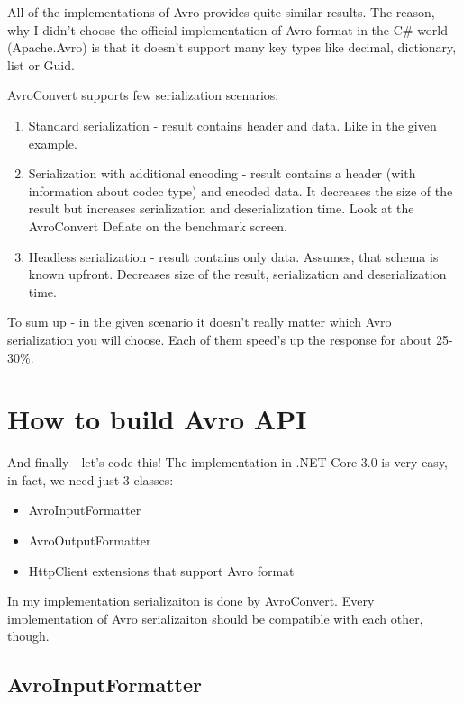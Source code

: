 \documentclass[]{article}
\begin{document}
All of the implementations of Avro provides quite similar results. The reason, why I didn't choose the official implementation of Avro format in the C\# world (Apache.Avro) is that it doesn't support many key types like decimal, dictionary, list or Guid. 

AvroConvert supports few serialization scenarios:
\begin{enumerate}
	\item Standard serialization - result contains header and data. Like in the given example.
	\item Serialization with additional encoding -  result contains a header (with information about codec type) and encoded data. It decreases the size of the result but increases serialization and deserialization time. Look at the AvroConvert Deflate on the benchmark screen.
	\item Headless serialization  - result contains only data. Assumes, that schema is known upfront. Decreases size of the result, serialization and deserialization time.
\end{enumerate}

To sum up - in the given scenario it doesn't really matter which Avro serialization you will choose. Each of them speed's up the response for about 25-30\%.


\section{How to build Avro API}

And finally - let's code this! The implementation in .NET Core 3.0 is very easy, in fact, we need just 3 classes: 

\begin{itemize}
	\item AvroInputFormatter
	\item AvroOutputFormatter
	\item HttpClient extensions that support Avro format
\end{itemize}

In my implementation serializaiton is done by AvroConvert. Every implementation of Avro serializaiton should be compatible with each other, though.

\subsection{AvroInputFormatter}
\end{document}
